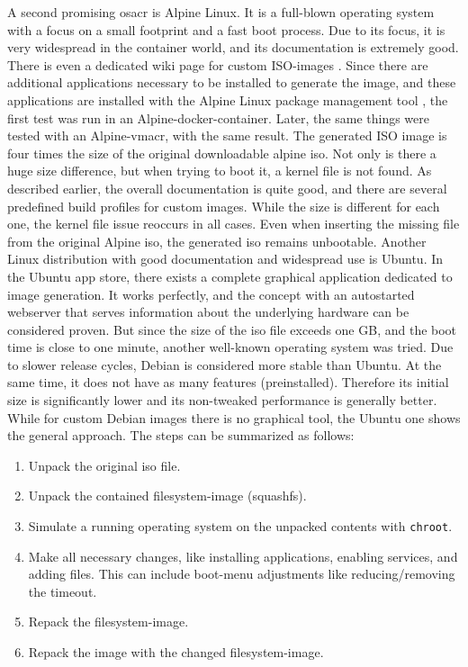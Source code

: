 \newline
A second promising \gls{osacr} is Alpine Linux. It is a full-blown operating system with a focus on a small footprint and a fast boot process. Due to its focus, it is very widespread in the container world, and its documentation is extremely good. There is even a dedicated wiki page for custom ISO-images \cite{alpine_custom_iso}. Since there are additional applications necessary to be installed to generate the image, and these applications are installed with the Alpine Linux package management tool , the first test was run in an Alpine-docker-container. Later, the same things were tested with an Alpine-\gls{vmacr}, with the same result. The generated ISO image is four times the size of the original downloadable alpine iso. Not only is there a huge size difference, but when trying to boot it, a kernel file is not found. As described earlier, the overall documentation is quite good, and there are several predefined build profiles for custom images. While the size is different for each one, the kernel file issue reoccurs in all cases. Even when inserting the missing file from the original Alpine iso, the generated iso remains unbootable.
\newline
Another Linux distribution with good documentation and widespread use is Ubuntu. In the Ubuntu app store, there exists a complete graphical application dedicated to image generation. It works perfectly, and the concept with an autostarted webserver that serves information about the underlying hardware can be considered proven. But since the size of the iso file exceeds one GB, and the boot time is close to one minute, another well-known operating system was tried.
\newline
Due to slower release cycles, Debian is considered more stable than Ubuntu. At the same time, it does not have as many features (preinstalled). Therefore its initial size is significantly lower and its non-tweaked performance is generally better. While for custom Debian images there is no graphical tool, the Ubuntu one shows the general approach. The steps can be summarized as follows:

\begin{enumerate}
  \item Unpack the original iso file.
  \item Unpack the contained filesystem-image (squashfs).
  \item Simulate a running operating system on the unpacked contents with \texttt{chroot}.
  \item Make all necessary changes, like installing applications, enabling services, and adding files. This can include boot-menu adjustments like reducing/removing the timeout.
  \item Repack the filesystem-image.
  \item Repack the image with the changed filesystem-image.
\end{enumerate}

